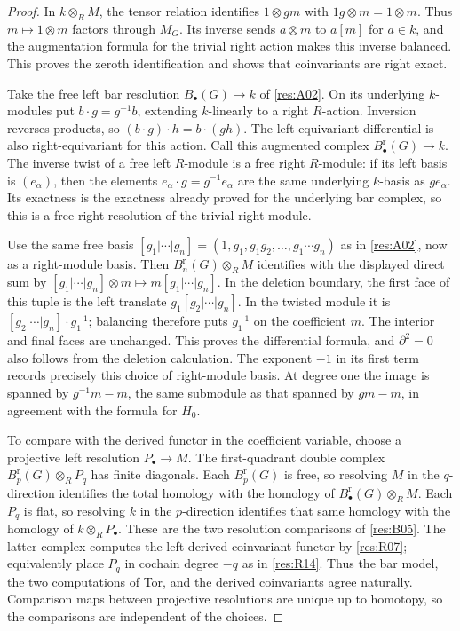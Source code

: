 \begin{proof}
In \(k\otimes_R M\), the tensor relation identifies
\(1\otimes gm\) with \(1g\otimes m=1\otimes m\). Thus
\(m\mapsto1\otimes m\) factors through \(M_G\). Its inverse sends
\(a\otimes m\) to \(a[m]\) for \(a\in k\), and the augmentation
formula for the trivial right action makes this inverse balanced.
This proves the zeroth identification and shows that coinvariants
are right exact.

Take the free left bar resolution \(B_\bullet(G)\to k\) of
\ref{res:A02}. On its underlying \(k\)-modules put
\(b\cdot g=g^{-1}b\), extending \(k\)-linearly to a right
\(R\)-action. Inversion reverses products, so
\((b\cdot g)\cdot h=b\cdot(gh)\). The left-equivariant
differential is also right-equivariant for this action.
Call this augmented complex \(B_\bullet^{\mathrm r}(G)\to k\).
The inverse twist of a free left \(R\)-module is a free right
\(R\)-module: if its left basis is \((e_\alpha)\), then
the elements \(e_\alpha\cdot g=g^{-1}e_\alpha\) are the same
underlying \(k\)-basis as \(g e_\alpha\).
Its exactness is the exactness already proved for the underlying
bar complex, so this is a free right resolution of the trivial
right module.

Use the same free basis
\([g_1|\cdots|g_n]=(1,g_1,g_1g_2,\ldots,g_1\cdots g_n)\)
as in \ref{res:A02}, now as a right-module basis.
Then \(B_n^{\mathrm r}(G)\otimes_R M\) identifies with the
displayed direct sum by
\([g_1|\cdots|g_n]\otimes m\mapsto m[g_1|\cdots|g_n]\).
In the deletion boundary, the first face of this tuple is
the left translate \(g_1[g_2|\cdots|g_n]\).
In the twisted module it is
\([g_2|\cdots|g_n]\cdot g_1^{-1}\); balancing therefore puts
\(g_1^{-1}\) on the coefficient \(m\). The interior and final
faces are unchanged. This proves the differential formula,
and \(\partial^2=0\) also follows from the deletion calculation.
The exponent \(-1\) in its first term records precisely this
choice of right-module basis. At degree one the image is
spanned by \(g^{-1}m-m\), the same submodule as that spanned by
\(gm-m\), in agreement with the formula for \(H_0\).

To compare with the derived functor in the coefficient variable,
choose a projective left resolution \(P_\bullet\to M\).
The first-quadrant double complex
\(B_p^{\mathrm r}(G)\otimes_R P_q\) has finite diagonals.
Each \(B_p^{\mathrm r}(G)\) is free, so resolving \(M\) in the
\(q\)-direction identifies the total homology with the homology
of \(B_\bullet^{\mathrm r}(G)\otimes_R M\).
Each \(P_q\) is flat, so resolving \(k\) in the \(p\)-direction
identifies that same homology with the homology of
\(k\otimes_R P_\bullet\). These are the two resolution
comparisons of \ref{res:B05}. The latter complex computes the
left derived coinvariant functor by \ref{res:R07}; equivalently
place \(P_q\) in cochain degree \(-q\) as in \ref{res:R14}.
Thus the bar model, the two computations of Tor, and the derived
coinvariants agree naturally. Comparison maps between projective
resolutions are unique up to homotopy, so the comparisons are
independent of the choices.


\end{proof}
